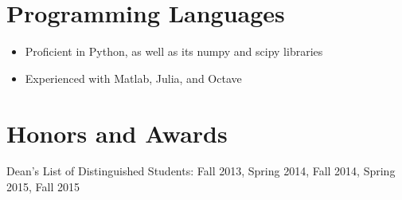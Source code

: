 \documentclass[12pt]{res}
\begin{document}
\begin{resume}
	\section{Programming Languages}
	\noindent
	\begin{itemize}
	\item Proficient in Python, as well as its numpy and scipy libraries
	\item Experienced with Matlab, Julia, and Octave
	\end{itemize}
  \vspace{-12pt}
  \section{Honors and Awards}
	\noindent
    Dean's List of Distinguished Students: Fall 2013, Spring 2014, Fall 2014, Spring 2015, Fall 2015\\

\end{resume}
\end{document}
